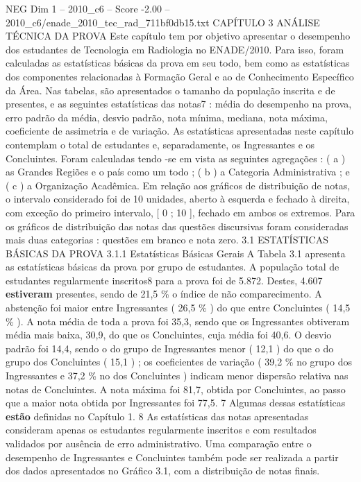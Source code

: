 \begin{textsample}{NEG Dim 1 – 2010\_c6 – Score -2.00 – 2010\_c6/enade\_2010\_tec\_rad\_711bf0db15.txt}  \label{ex:f1_neg_279}
CAPÍTULO 3 ANÁLISE TÉCNICA DA PROVA Este capítulo tem por objetivo apresentar o desempenho dos estudantes de Tecnologia em Radiologia no ENADE/2010.
Para isso, foram calculadas as estatísticas básicas da prova em seu todo, bem como as estatísticas dos componentes relacionadas à Formação Geral e ao de Conhecimento Específico da Área.
Nas tabelas, são apresentados o tamanho da população inscrita e de presentes, e as seguintes estatísticas das notas7 : média do desempenho na prova, erro padrão da média, desvio padrão, nota mínima, mediana, nota máxima, coeficiente de assimetria e de variação.
As estatísticas apresentadas neste capítulo contemplam o total de estudantes e, separadamente, os Ingressantes e os Concluintes.
Foram calculadas tendo -se em vista as seguintes agregações : ( a ) as Grandes Regiões e o país como um todo ; ( b ) a Categoria Administrativa ; e ( c ) a Organização Acadêmica.
Em relação aos gráficos de distribuição de notas, o intervalo considerado foi de 10 unidades, aberto à esquerda e fechado à direita, com exceção do primeiro intervalo, [ 0 ; 10 ], fechado em ambos os extremos.
Para os gráficos de distribuição das notas das questões discursivas foram consideradas mais duas categorias : questões em branco e nota zero. 3.1 ESTATÍSTICAS BÁSICAS DA PROVA 3.1.1 Estatísticas Básicas Gerais A Tabela 3.1 apresenta as estatísticas básicas da prova por grupo de estudantes.
A população total de estudantes regularmente inscritos8 para a prova foi de 5.872.
Destes, 4.607 \textbf{estiveram} presentes, sendo de 21,5 \% o índice de não comparecimento.
A abstenção foi maior entre Ingressantes ( 26,5 \% ) do que entre Concluintes ( 14,5 \% ).
A nota média de toda a prova foi 35,3, sendo que os Ingressantes obtiveram média mais baixa, 30,9, do que os Concluintes, cuja média foi 40,6.
O desvio padrão foi 14,4, sendo o do grupo de Ingressantes menor ( 12,1 ) do que o do grupo dos Concluintes ( 15,1 ) ; os coeficientes de variação ( 39,2 \% no grupo dos Ingressantes e 37,2 \% no dos Concluintes ) indicam menor dispersão relativa nas notas de Concluintes.
A nota máxima foi 81,7, obtida por Concluintes, ao passo que a maior nota obtida por Ingressantes foi 77,5. 7 Algumas dessas estatísticas \textbf{estão} definidas no Capítulo 1. 8 As estatísticas das notas apresentadas consideram apenas os estudantes regularmente inscritos e com resultados validados por ausência de erro administrativo.
Uma comparação entre o desempenho de Ingressantes e Concluintes também pode ser realizada a partir dos dados apresentados no Gráfico 3.1, com a distribuição de notas finais.

\end{textsample}
